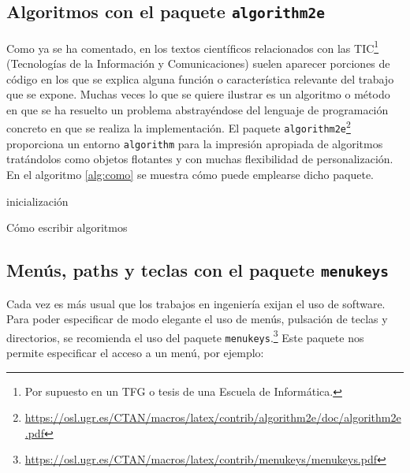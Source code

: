 \documentclass[11pt,a4paper]{article}
\begin{document}
\subsection{Algoritmos con el paquete \texttt{algorithm2e}}
Como ya se ha comentado, en los textos científicos relacionados con las TIC\footnote{Por supuesto en un TFG o tesis de una Escuela de Informática.} (Tecnologías de la Información y Comunicaciones) suelen aparecer porciones de código en los que se explica alguna función o característica relevante del trabajo que se expone. Muchas veces lo que se quiere ilustrar es un algoritmo o método en que se ha resuelto un problema abstrayéndose del lenguaje de programación concreto en que se realiza la implementación. El paquete \texttt{algorithm2e}\footnote{\url{https://osl.ugr.es/CTAN/macros/latex/contrib/algorithm2e/doc/algorithm2e.pdf}} proporciona un entorno \texttt{algorithm} para la impresión apropiada de algoritmos tratándolos como objetos flotantes y con muchas flexibilidad de personalización. En el algoritmo \ref{alg:como} se muestra cómo puede emplearse dicho paquete.


\IncMargin{1em}
\begin{algorithm}
\LinesNumbered
\SetAlgoLined


inicialización\;

\caption{Cómo escribir algoritmos}\label{alg:como}
\end{algorithm}\DecMargin{1em}

\newpage
\subsection{Menús, paths y teclas con el paquete \texttt{menukeys}}
Cada vez es más usual que los trabajos en ingeniería exijan el uso de 
software. Para poder especificar de modo elegante el uso de menús, pulsación de 
teclas y directorios, se recomienda el uso del paquete 
\texttt{menukeys}.\footnote{\url{https://osl.ugr.es/CTAN/macros/latex/contrib/menukeys/menukeys.pdf}}
  Este paquete nos permite especificar el acceso a un menú, por 
ejemplo:\\
\end{document}
